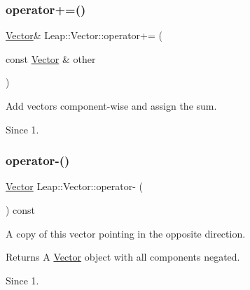 \subsubsection{\texorpdfstring{operator+=()}{operator+=()}}
{\footnotesize\ttfamily \hyperlink{struct_leap_1_1_vector}{Vector}\& Leap\+::\+Vector\+::operator+= (\begin{DoxyParamCaption}\item[{const \hyperlink{struct_leap_1_1_vector}{Vector} \&}]{other }\end{DoxyParamCaption})\hspace{0.3cm}{\ttfamily [inline]}}

Add vectors component-\/wise and assign the sum. \begin{DoxySince}{Since}
1. 
\end{DoxySince}
\mbox{\label{struct_leap_1_1_vector_a5c3d49e360bbef5ce6e2766e17b4a03b}} 
\subsubsection{\texorpdfstring{operator-\/()}{operator-()}\hspace{0.1cm}{\footnotesize\ttfamily [1/2]}}
{\footnotesize\ttfamily \hyperlink{struct_leap_1_1_vector}{Vector} Leap\+::\+Vector\+::operator-\/ (\begin{DoxyParamCaption}{ }\end{DoxyParamCaption}) const\hspace{0.3cm}{\ttfamily [inline]}}

A copy of this vector pointing in the opposite direction.


\begin{DoxyCodeInclude}
\end{DoxyCodeInclude}


\begin{DoxyReturn}{Returns}
A \hyperlink{struct_leap_1_1_vector}{Vector} object with all components negated. 
\end{DoxyReturn}
\begin{DoxySince}{Since}
1. 
\end{DoxySince}
\mbox{\label{struct_leap_1_1_vector_a6304f66244a3deb215af604a5fb9a782}} 
